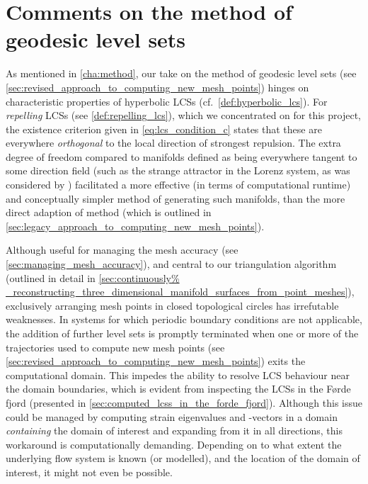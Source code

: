 \section{Comments on the method of geodesic level sets}
\label{sec:comments_on_the_method_of_geodesic_level_sets}
%
As mentioned in \cref{cha:method}, our take on the method of geodesic level
sets (see \cref{sec:revised_approach_to_computing_new_mesh_points}) hinges on
characteristic properties of hyperbolic LCSs (cf.\ \cref{def:hyperbolic_lcs}).
For \emph{repelling} LCSs (see \cref{def:repelling_lcs}), which we concentrated
on for this project, the existence criterion given in \cref{eq:lcs_condition_c}
states that these are everywhere \emph{orthogonal} to the local direction of
strongest repulsion. The extra degree of freedom compared to manifolds defined
as being everywhere tangent to some direction field (such as the strange
attractor in the Lorenz system, as was considered by
\textcite{krauskopf2005survey}) facilitated a more effective (in terms of
computational runtime) and conceptually simpler method of generating such
manifolds, than the more direct adaption of 
method (which is outlined in
\cref{sec:legacy_approach_to_computing_new_mesh_points}).

Although useful for managing the mesh accuracy (see
\cref{sec:managing_mesh_accuracy}), and central to our
triangulation algorithm (outlined in detail in \cref{sec:continuously%
_reconstructing_three_dimensional_manifold_surfaces_from_point_meshes}),
exclusively arranging mesh points in closed topological circles has irrefutable
weaknesses. In systems for which periodic boundary conditions are not
applicable, the addition of further level sets is promptly terminated when one
or more of the trajectories used to compute new mesh points (see
\cref{sec:revised_approach_to_computing_new_mesh_points}) exits the
computational domain. This impedes the ability to resolve LCS behaviour near
the domain boundaries, which is evident from inspecting the LCSs in the Førde
fjord (presented in \cref{sec:computed_lcss_in_the_forde_fjord}). Although this
issue could be managed by computing strain eigenvalues and -vectors in a domain
\emph{containing} the domain of interest and expanding from it in all
directions, this workaround is computationally demanding. Depending on to what
extent the underlying flow system is known (or modelled), and the location of
the domain of interest, it might not even be possible.

